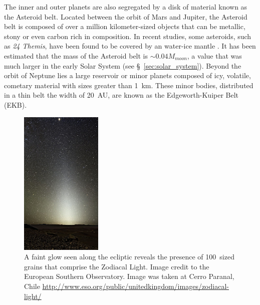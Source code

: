     
    The inner and outer planets are also segregated by a disk of material known as the Asteroid belt. Located between the orbit of Mars and Jupiter, the Asteroid belt is composed of over a million kilometer-sized objects that can be metallic, stony or even carbon rich in composition. In recent studies, some asteroids, such as \textit{24 Themis}, have been found to be covered by an water-ice mantle \citep{Campins2010}. It has been estimated that the mass of the Asteroid belt is $\sim0.04 M_{moon}$, a value that was much larger in the early Solar System (see \S~\ref{sec:solar_system}). Beyond the orbit of Neptune lies a large reservoir or minor planets composed of icy, volatile, cometary material with sizes greater than 1~km. These minor bodies, distributed in a thin belt the width of 20~AU, are known as the Edgeworth-Kuiper Belt (EKB).
    \begin{figure}
    \centering
    \includegraphics[width=0.35\textwidth]{Ch1/Zodiacal_Light_Paranal} 
    \caption[Zodiacal Light On Earth]{A faint glow seen along the ecliptic reveals the presence of 100\micron\  sized grains that comprise the Zodiacal Light. Image credit to the European Southern Observatory. Image was taken at Cerro Paranal, Chile \url{http://www.eso.org/public/unitedkingdom/images/zodiacal-light/}}
    \label{fig:ZD_ESO}
    \end{figure}
    
